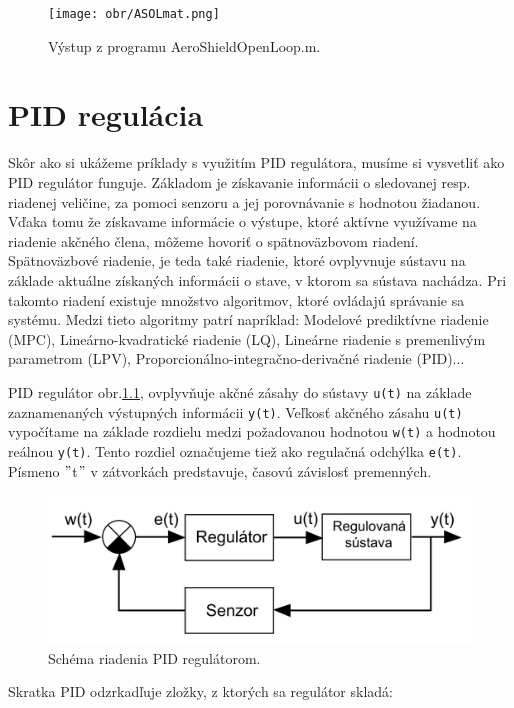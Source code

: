 \begin{figure}[!tbh]
	\centering
	\texttt{[image: obr/ASOLmat.png]}
	\caption{Výstup z programu AeroShieldOpenLoop.m.}\label{OBRAZOK 3.2}
\end{figure}


\chapter{PID regulácia}
\label{PIDPID}

Skôr ako si ukážeme príklady s využitím PID regulátora, musíme si vysvetliť ako PID regulátor funguje. Základom je získavanie informácii o sledovanej resp. riadenej veličine, za pomoci senzoru a jej porovnávanie s hodnotou žiadanou. Vďaka tomu že získavame informácie o výstupe, ktoré aktívne využívame na riadenie akčného člena, môžeme hovoriť o spätnoväzbovom riadení. Spätnoväzbové riadenie, je teda také riadenie, ktoré ovplyvnuje sústavu na základe aktuálne získaných informácii o stave, v ktorom sa sústava nachádza. Pri takomto riadení existuje množstvo algoritmov, ktoré ovládajú správanie sa systému. Medzi tieto algoritmy patrí napríklad: Modelové prediktívne riadenie (MPC), Lineárno-kvadratické riadenie (LQ), Lineárne riadenie s premenlivým parametrom (LPV), Proporcionálno-integračno-derivačné riadenie (PID)...

PID regulátor obr.\ref{OBRAZOK 3.3}, ovplyvňuje akčné zásahy do sústavy \verb|u(t)| na základe zaznamenaných výstupných informácii \verb|y(t)|. Veľkosť akčného zásahu \verb|u(t)| vypočítame na základe rozdielu medzi požadovanou hodnotou \verb|w(t)| a hodnotou reálnou \verb|y(t)|. Tento rozdiel označujeme tiež ako regulačná odchýlka \verb|e(t)|. Písmeno $"$t$"$ v zátvorkách predstavuje, časovú závislosť premenných. 

\begin{figure}[!tbh]
	\centering
	\includegraphics[width=120mm]{obr/pid.jpg}
	\caption{Schéma riadenia PID regulátorom.}\label{OBRAZOK 3.3}
\end{figure}

Skratka PID odzrkadľuje zložky, z ktorých sa regulátor skladá: 

